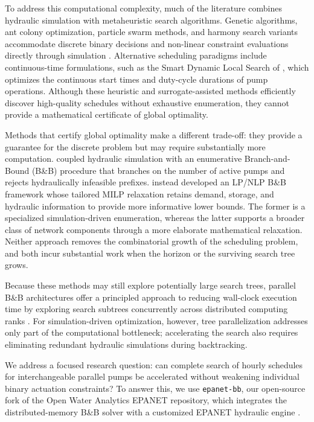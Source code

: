 \documentclass[Journal,letterpaper,InsideFigs]{ascelike-new}
\begin{document}
To address this computational complexity, much of the literature combines hydraulic simulation with metaheuristic search algorithms. Genetic algorithms, ant colony optimization, particle swarm methods, and harmony search variants accommodate discrete binary decisions and non-linear constraint evaluations directly through simulation \cite{Mackle1995,Savic1997,LpezIbez2008,AlAni2012,Paola2024}. Alternative scheduling paradigms include continuous-time formulations, such as the Smart Dynamic Local Search of , which optimizes the continuous start times and duty-cycle durations of pump operations. Although these heuristic and surrogate-assisted methods \cite{Broad2010,Rao2007,Ashraf2024} efficiently discover high-quality schedules without exhaustive enumeration, they cannot provide a mathematical certificate of global optimality.

Methods that certify global optimality make a different trade-off: they provide a guarantee for the discrete problem but may require substantially more computation.  coupled hydraulic simulation with an enumerative Branch-and-Bound (B\&B) procedure that branches on the number of active pumps and rejects hydraulically infeasible prefixes.  instead developed an LP/NLP B\&B framework whose tailored MILP relaxation retains demand, storage, and hydraulic information to provide more informative lower bounds. The former is a specialized simulation-driven enumeration, whereas the latter supports a broader class of network components through a more elaborate mathematical relaxation. Neither approach removes the combinatorial growth of the scheduling problem, and both incur substantial work when the horizon or the surviving search tree grows.

Because these methods may still explore potentially large search trees, parallel B\&B architectures offer a principled approach to reducing wall-clock execution time by exploring search subtrees concurrently across distributed computing ranks \cite{Gendron1994,Li1986,Hrga2021}. For simulation-driven optimization, however, tree parallelization addresses only part of the computational bottleneck; accelerating the search also requires eliminating redundant hydraulic simulations during backtracking.

We address a focused research question: can complete search of hourly schedules for interchangeable parallel pumps be accelerated without weakening individual binary actuation constraints? To answer this, we use \texttt{epanet-bb}, our open-source fork of the Open Water Analytics EPANET repository, which integrates the distributed-memory B\&B solver with a customized EPANET hydraulic engine \cite{owaepanet}.
\end{document}
